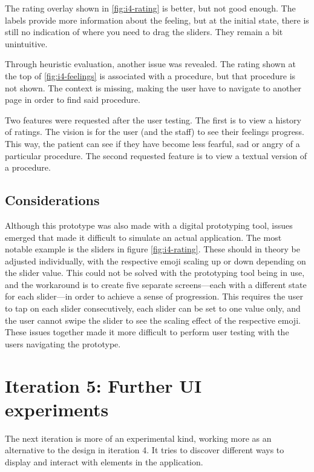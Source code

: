 The rating overlay shown in \autoref{fig:i4-rating} is better, but not good enough. The labels provide more information about the feeling, but at the initial state, there is still no indication of where you need to drag the sliders. They remain a bit unintuitive.

Through heuristic evaluation, another issue was revealed. The rating shown at the top of \autoref{fig:i4-feelings} is associated with a procedure, but that procedure is not shown. The context is missing, making the user have to navigate to another page in order to find said procedure.

Two features were requested after the user testing. The first is to view a history of ratings. The vision is for the user (and the staff) to see their feelings progress. This way, the patient can see if they have become less fearful, sad or angry of a particular procedure. The second requested feature is to view a textual version of a procedure.

\subsection{Considerations}

Although this prototype was also made with a digital prototyping tool, issues emerged that made it difficult to simulate an actual application. The most notable example is the sliders in figure \ref{fig:i4-rating}. These should in theory be adjusted individually, with the respective emoji scaling up or down depending on the slider value. This could not be solved with the prototyping tool being in use, and the workaround is to create five separate screens---each with a different state for each slider---in order to achieve a sense of progression. This requires the user to tap on each slider consecutively, each slider can be set to one value only, and the user cannot swipe the slider to see the scaling effect of the respective emoji. These issues together made it more difficult to perform user testing with the users navigating the prototype.

\section{Iteration 5: Further UI experiments}
\label{sec:iteration5}

The next iteration is more of an experimental kind, working more as an alternative to the design in iteration 4. It tries to discover different ways to display and interact with elements in the application.

